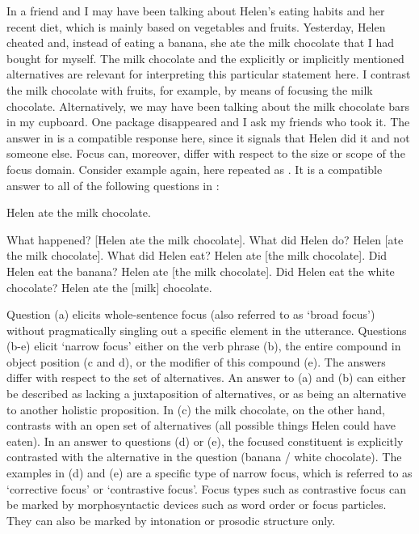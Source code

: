 In  a friend and I may have been talking about Helen’s eating habits and her recent diet, which is mainly based on vegetables and fruits. Yesterday, Helen cheated and, instead of eating a banana, she ate the milk chocolate that I had bought for myself. The milk chocolate and the explicitly or implicitly mentioned alternatives are relevant for interpreting this particular statement here. I contrast the milk chocolate with fruits, for example, by means of focusing the milk chocolate. Alternatively, we may have been talking about the milk chocolate bars in my cupboard. One package disappeared and I ask my friends who took it. The answer in  is a compatible response here, since it signals that Helen did it and not someone else. Focus can, moreover, differ with respect to the size or scope of the focus domain. Consider example  again, here repeated as . It is a compatible answer to all of the following questions in :

\begin{exe}
\ex\label{ex:5:6} Helen ate the milk chocolate.
\ex\label{ex:5:7} \begin{xlist}
                \ex\label{ex:5:7a} What happened?			[Helen ate the milk chocolate].
                \ex\label{ex:5:7b} What did Helen do?			Helen [ate the milk chocolate].
                \ex\label{ex:5:7c} What did Helen eat?			Helen ate [the milk chocolate].
                \ex\label{ex:5:7d} Did Helen eat the banana?		Helen ate [the milk chocolate].
                \ex\label{ex:5:7e} Did Helen eat the white chocolate?	Helen ate the [milk] chocolate.
\end{xlist}
\end{exe}

Question (a) elicits whole-sentence focus (also referred to as ‘broad focus’) without pragmatically singling out a specific element in the utterance. Questions (b-e) elicit ‘narrow focus’ either on the verb phrase (b), the entire compound in object position (c and d), or the modifier of this compound (e). The answers differ with respect to the set of alternatives. An answer to (a) and (b) can either be described as lacking a juxtaposition of alternatives, or as being an alternative to another holistic proposition. In (c) the milk chocolate, on the other hand, contrasts with an open set of alternatives (all possible things Helen could have eaten). In an answer to questions (d) or (e), the focused constituent is explicitly contrasted with the alternative in the question (banana / white chocolate). The examples in (d) and (e) are a specific type of narrow focus, which is referred to as ‘corrective focus’ or ‘contrastive focus’. Focus types such as contrastive focus can be marked by morphosyntactic devices such as word order or focus particles. They can also be marked by intonation or prosodic structure only.

